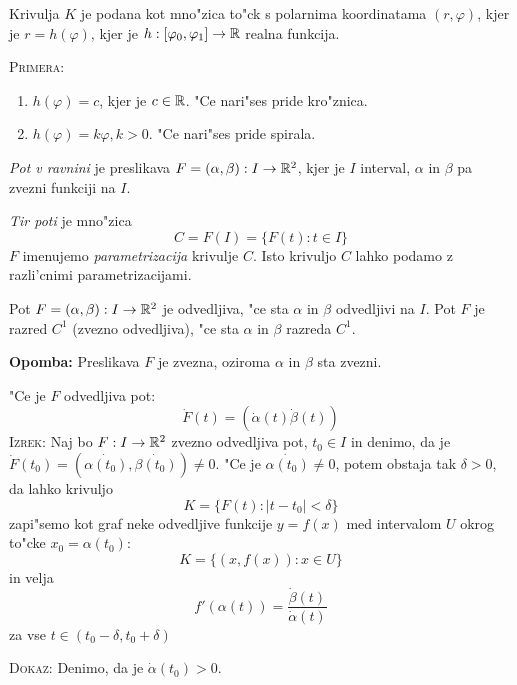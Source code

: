 Krivulja $K$ je podana kot mno"zica to"ck s polarnima koordinatama $(r, \varphi)$, kjer je $r = h(\varphi)$, kjer je $h: [\varphi_0, \varphi_1] \to \mathbb{R}$ realna funkcija.

\textsc{Primera:}
\begin{enumerate}
	\item $h(\varphi) = c$, kjer je $c \in \mathbb{R}$. "Ce nari"ses pride kro"znica.
	\item $h(\varphi) = k\varphi, k > 0$. "Ce nari"ses pride spirala.
\end{enumerate}
%
 \emph{Pot v ravnini} je preslikava $F = (\alpha, \beta): I \to \mathbb{R}^2$, kjer je $I$ interval, $\alpha$ in $\beta$ pa zvezni funkciji na $I$.

\emph{Tir poti} je mno"zica
\begin{equation*}
C = F(I) = \{F(t): t \in I\}
\end{equation*}
$F$ imenujemo \emph{parametrizacija} krivulje $C$. Isto krivuljo $C$ lahko podamo z razli'cnimi parametrizacijami.

 Pot $F = (\alpha, \beta): I \to \mathbb{R}^2$ je odvedljiva, "ce sta $\alpha$ in $\beta$ odvedljivi na $I$. Pot $F$ je razred $C^1$ (zvezno odvedljiva), "ce sta $\alpha$ in $\beta$ razreda $C^1$.

\textbf{Opomba:} Preslikava $F$ je zvezna, oziroma $\alpha$ in $\beta$ sta zvezni.

"Ce je $F$ odvedljiva pot:
\begin{equation*}
\dot{F}(t) = (\dot{\alpha}(t) \dot{\beta}(t))
\end{equation*}
%
\textsc{Izrek:} Naj bo $F: I \to \mathbb{R}^2$ zvezno odvedljiva pot, $t_0 \in I$ in denimo, da je $\dot{F}(t_0) = (\dot{\alpha(t_0)}, \dot{\beta(t_0)}) \neq 0$. "Ce je $\dot{\alpha(t_0)} \neq 0$, potem obstaja tak $\delta > 0$, da lahko krivuljo
\begin{equation*}
K = \{F(t): |t - t_0| < \delta\}
\end{equation*}
zapi"semo kot graf neke odvedljive funkcije $y = f(x)$ med intervalom $U$ okrog to"cke $x_0 = \alpha(t_0)$:
\begin{equation*}
K = \{(x, f(x)): x \in U\}
\end{equation*}
in velja
\begin{equation*}
f'(\alpha(t)) = \dfrac{\dot{\beta}(t)}{\dot{\alpha}(t)}
\end{equation*}
za vse $t \in (t_0 - \delta, t_0 + \delta)$

\textsc{Dokaz:} Denimo, da je $\dot{\alpha}(t_0) > 0$.

